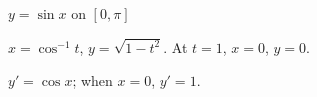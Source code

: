 {$y=\sin x$ on $[0,\pi]$
}
{$x=\cos^{-1} t$, $y=\sqrt{1-t^2}$. At $t=1$, $x=0$, $y=0$.

$y'=\cos x$; when $x=0$, $y'=1$.
}